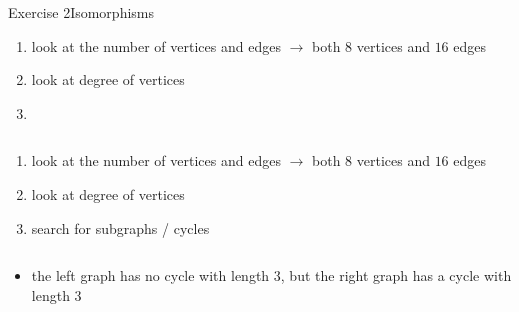 \begin{frame}[allowframebreaks]{Exercise 2}{Isomorphisms}
\begin{solutionnoinc}
    \begin{enumerate}
      \item look at the \alert{number} of \alert{vertices} and \alert{edges} $\rightarrow$ both $8$ vertices and $16$ edges
      \item look at \alert{degree} of vertices
      \item[]
    \end{enumerate}
  \end{solutionnoinc}
  \begin{solutionnoinc}
    \begin{columns}
      \begin{column}{0.5\textwidth}
      \end{column}
      \begin{column}{0.5\textwidth}
      \end{column}
    \end{columns}
    \vspace{0.5cm}
    \begin{enumerate}
      \item look at the \alert{number} of \alert{vertices} and \alert{edges} $\rightarrow$ both $8$ vertices and $16$ edges
      \item look at \alert{degree} of vertices
      \item search for \alert{subgraphs} / \alert{cycles}
    \end{enumerate}
  \end{solutionnoinc}
  \begin{solution}
    \begin{columns}
      \begin{column}{0.5\textwidth}
      \end{column}
      \begin{column}{0.5\textwidth}
      \end{column}
    \end{columns}
    \vspace{0.5cm}
    \begin{itemize}
      \item the left graph has no cycle with length $3$, but the right graph has a cycle with length $3$
    \end{itemize}
  \end{solution}

\end{frame}
